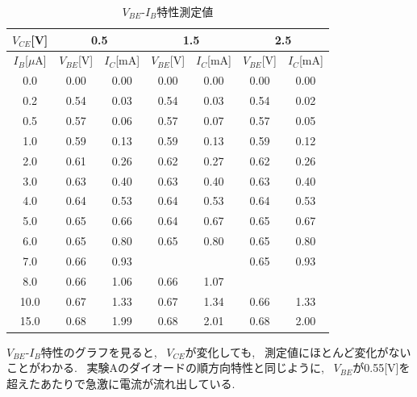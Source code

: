 \documentclass[uplatex,dvipdfmx,a4paper,js=standard, titlepage]{bxjsarticle}
\begin{document}
            \begin{table}[ht]
                \begin{center}
                    \caption{$V_{BE}$-$I_B$特性測定値}
                    \label{tab:VBE-IB}
                    \begin{tabular}{c||c|c||c|c||c|c}
                        $V_{CE}$[V] & \multicolumn{2}{c||}{0.5} & \multicolumn{2}{c||}{1.5} & \multicolumn{2}{c}{2.5} \\ \hline
                        $I_B$[$\mu$A] & $V_{BE}$[V] & $I_C$[mA] & $V_{BE}$[V] & $I_C$[mA] & $V_{BE}$[V] & $I_C$[mA] \\ \hline \hline
                        0.0 & 0.00 & 0.00 & 0.00 & 0.00 & 0.00 & 0.00 \\
                        0.2 & 0.54 & 0.03 & 0.54 & 0.03 & 0.54 & 0.02 \\
                        0.5 & 0.57 & 0.06 & 0.57 & 0.07 & 0.57 & 0.05 \\
                        1.0 & 0.59 & 0.13 & 0.59 & 0.13 & 0.59 & 0.12 \\
                        2.0 & 0.61 & 0.26 & 0.62 & 0.27 & 0.62 & 0.26 \\
                        3.0 & 0.63 & 0.40 & 0.63 & 0.40 & 0.63 & 0.40 \\
                        4.0 & 0.64 & 0.53 & 0.64 & 0.53 & 0.64 & 0.53 \\
                        5.0 & 0.65 & 0.66 & 0.64 & 0.67 & 0.65 & 0.67 \\
                        6.0 & 0.65 & 0.80 & 0.65 & 0.80 & 0.65 & 0.80 \\
                        7.0 & 0.66 & 0.93 &  &  & 0.65 & 0.93 \\
                        8.0 & 0.66 & 1.06 & 0.66 & 1.07 &  &  \\
                        10.0 & 0.67 & 1.33 & 0.67 & 1.34 & 0.66 & 1.33 \\
                        15.0 & 0.68 & 1.99 & 0.68 & 2.01 & 0.68 & 2.00
                    \end{tabular}
                \end{center}

            \end{table}

            $V_{BE}$-$I_B$特性のグラフを見ると, ~$V_{CE}$が変化しても, ~測定値にほとんど変化がないことがわかる.
            ~実験Aのダイオードの順方向特性と同じように, ~$V_{BE}$が0.55[V]を超えたあたりで急激に電流が流れ出している.
\end{document}
